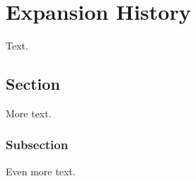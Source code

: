 \chapter{Expansion History\label{cha: expansion history}}

Text.

\section{Section}

More text.

\subsection{Subsection}

Even more text.